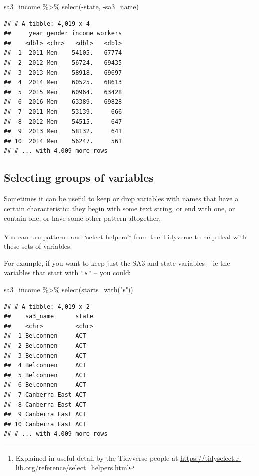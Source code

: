 \documentclass[
]{book}
\newenvironment{Shaded}{\begin{snugshade}}{\end{snugshade}}
\newcommand{\FunctionTok}[1]{\textcolor[rgb]{0.00,0.00,0.00}{#1}}
\newcommand{\NormalTok}[1]{#1}
\newcommand{\SpecialCharTok}[1]{\textcolor[rgb]{0.00,0.00,0.00}{#1}}
\newcommand{\StringTok}[1]{\textcolor[rgb]{0.31,0.60,0.02}{#1}}
\begin{document}
\begin{Shaded}
\begin{Highlighting}[]
\NormalTok{sa3\_income }\SpecialCharTok{\%\textgreater{}\%} 
  \FunctionTok{select}\NormalTok{(}\SpecialCharTok{{-}}\NormalTok{state, }\SpecialCharTok{{-}}\NormalTok{sa3\_name)}
\end{Highlighting}
\end{Shaded}

\begin{verbatim}
## # A tibble: 4,019 x 4
##     year gender income workers
##    <dbl> <chr>   <dbl>   <dbl>
##  1  2011 Men    54105.   67774
##  2  2012 Men    56724.   69435
##  3  2013 Men    58918.   69697
##  4  2014 Men    60525.   68613
##  5  2015 Men    60964.   63428
##  6  2016 Men    63389.   69828
##  7  2011 Men    53139.     666
##  8  2012 Men    54515.     647
##  9  2013 Men    58132.     641
## 10  2014 Men    56247.     561
## # ... with 4,009 more rows
\end{verbatim}

\hypertarget{selecting-groups-of-variables}{%
\subsection{Selecting groups of variables}\label{selecting-groups-of-variables}}

Sometimes it can be useful to keep or drop variables with names that have a certain characteristic; they begin with some text string, or end with one, or contain one, or have some other pattern altogether.

You can use patterns and \href{https://tidyselect.r-lib.org/reference/select_helpers.html}{`select helpers'}\footnote{Explained in useful detail by the Tidyverse people at \url{https://tidyselect.r-lib.org/reference/select_helpers.html}}
from the Tidyverse to help deal with these sets of variables.

For example, if you want to keep just the SA3 and state variables -- ie the variables that start with \texttt{"s"} -- you could:

\begin{Shaded}
\begin{Highlighting}[]
\NormalTok{sa3\_income }\SpecialCharTok{\%\textgreater{}\%} 
  \FunctionTok{select}\NormalTok{(}\FunctionTok{starts\_with}\NormalTok{(}\StringTok{"s"}\NormalTok{))}
\end{Highlighting}
\end{Shaded}

\begin{verbatim}
## # A tibble: 4,019 x 2
##    sa3_name      state
##    <chr>         <chr>
##  1 Belconnen     ACT  
##  2 Belconnen     ACT  
##  3 Belconnen     ACT  
##  4 Belconnen     ACT  
##  5 Belconnen     ACT  
##  6 Belconnen     ACT  
##  7 Canberra East ACT  
##  8 Canberra East ACT  
##  9 Canberra East ACT  
## 10 Canberra East ACT  
## # ... with 4,009 more rows
\end{verbatim}
\end{document}
